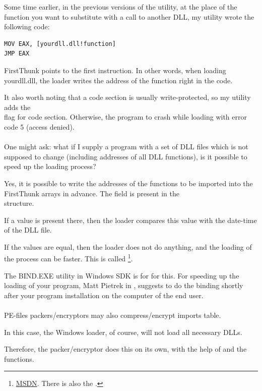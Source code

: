 Some time earlier, in the previous versions of the utility, 
at the place of the function you want to substitute with a call to another DLL,
my utility wrote the following code:

\begin{lstlisting}
MOV EAX, [yourdll.dll!function]
JMP EAX
\end{lstlisting}

FirstThunk points to the first instruction. In other words, when loading yourdll.dll,
the loader writes the address of the  function right in the code.

It also worth noting that a code section is usually write-protected, so my utility adds the \\
flag for code section. Otherwise, the program to crash while loading with error code
5 (access denied). \\
\\
One might ask: what if I supply a program with a set of DLL files which is not supposed to change (including addresses of all DLL functions),
is it possible to speed up the loading process?

Yes, it is possible to write the addresses of the functions to be imported into the FirstThunk arrays in advance.
The  field is present in the \\
 structure.

If a value is present there, then the loader compares this value with the date-time of the DLL file.

If the values are equal, then the loader does not do anything, and the loading of the process can be faster.
This is called 
\footnote{\href{http://go.yurichev.com/17050}{MSDN}. There is also the .}.

The BIND.EXE utility in Windows SDK is for for this.
For speeding up the loading of your program, Matt Pietrek in \cite{Pietrek1}, suggests to do the binding shortly after your program
installation on the computer of the end user. \\
\\
PE-files packers/encryptors may also compress/encrypt imports table.

In this case, the Windows loader, of course, will not load all necessary DLLs.

Therefore, the packer/encryptor does this on its own, with the help of 
 and the  functions.

